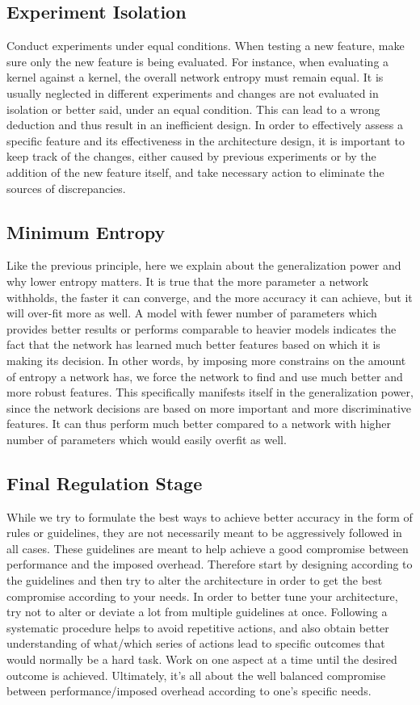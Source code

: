 \documentclass{article} \usepackage{lets_keepit_simple,times}
\begin{document}
\subsection{Experiment Isolation}
Conduct experiments under equal conditions. When testing a new feature, make sure only the new feature is being evaluated. For instance, when evaluating a  kernel against a  kernel, the overall network entropy must remain equal. It is usually neglected in different experiments and changes are not evaluated in isolation or better said, under an equal condition. This can lead to a wrong deduction and thus result in an inefficient design. In order to effectively assess a specific feature and its effectiveness in the architecture design, it is important to keep track of the changes, either caused by previous experiments or by the addition of the new feature itself, and take necessary action to eliminate the sources of discrepancies. 
\subsection{Minimum Entropy}
Like the previous principle, here we explain about the generalization power and why lower entropy matters. It is true that the more parameter a network withholds, the faster it can converge, and the more accuracy it can achieve, but it will over-fit more as well. A model with fewer number of parameters which provides better results or performs comparable to heavier models indicates the fact that the network has learned much better features based on which it is making its decision. In other words, by imposing more constrains on the amount of entropy a network has, we force the network to find and use much better and more robust features. This specifically manifests itself in the generalization power, since the network decisions are based on more important and more discriminative features. It can thus perform much better compared to a network with higher number of parameters which would easily overfit as well.    
\subsection{Final Regulation Stage}
While we try to formulate the best ways to achieve better accuracy in the form of rules or guidelines, they are not necessarily meant to be aggressively followed in all cases. These guidelines are meant to help achieve a good compromise between performance and the imposed overhead. Therefore start by designing according to the guidelines and then try to alter the architecture in order to get the best compromise according to your needs. In order to better tune your architecture, try not to alter or deviate a lot from multiple guidelines at once. Following a systematic procedure helps to avoid repetitive actions, and also obtain better understanding of what/which series of actions lead to specific outcomes that would normally be a hard task. Work on one aspect at a time until the desired outcome is achieved. Ultimately, it's all about the well balanced compromise between performance/imposed overhead according to one's specific needs.\\
\end{document}
